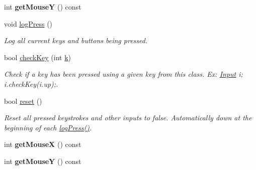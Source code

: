 \begin{DoxyCompactItemize}
\item 
int {\bfseries get\+MouseY} () const \hypertarget{classInput_a403d5f32a558a76422dba94c1121bd70}{}\label{classInput_a403d5f32a558a76422dba94c1121bd70}

\item 
void \hyperlink{classInput_a7664a52377e4bda7524d288df481954b}{log\+Press} ()\hypertarget{classInput_a7664a52377e4bda7524d288df481954b}{}\label{classInput_a7664a52377e4bda7524d288df481954b}

\begin{DoxyCompactList}\small\item\em Log all current keys and buttons being pressed. \end{DoxyCompactList}\item 
bool \hyperlink{classInput_a2f5d21366e04e3ce200fe73c6c748dd8}{check\+Key} (int \hyperlink{classInput_aa069678fdc7c45c405c044ed8e45a379}{k})\hypertarget{classInput_a2f5d21366e04e3ce200fe73c6c748dd8}{}\label{classInput_a2f5d21366e04e3ce200fe73c6c748dd8}

\begin{DoxyCompactList}\small\item\em Check if a key has been pressed using a given key from this class. Ex\+: \hyperlink{classInput}{Input} i; i.\+check\+Key(i.\+up);. \end{DoxyCompactList}\item 
bool \hyperlink{classInput_ac4fc1b961553d6ca8a603ee0a53f311c}{reset} ()\hypertarget{classInput_ac4fc1b961553d6ca8a603ee0a53f311c}{}\label{classInput_ac4fc1b961553d6ca8a603ee0a53f311c}

\begin{DoxyCompactList}\small\item\em Reset all pressed keystrokes and other inputs to false. Automatically down at the beginning of each \hyperlink{classInput_a7664a52377e4bda7524d288df481954b}{log\+Press()}. \end{DoxyCompactList}\item 
int {\bfseries get\+MouseX} () const \hypertarget{classInput_a08e8c4c83414948fa86aadda2c206569}{}\label{classInput_a08e8c4c83414948fa86aadda2c206569}

\item 
int {\bfseries get\+MouseY} () const \hypertarget{classInput_a403d5f32a558a76422dba94c1121bd70}{}\label{classInput_a403d5f32a558a76422dba94c1121bd70}

\end{DoxyCompactItemize}
